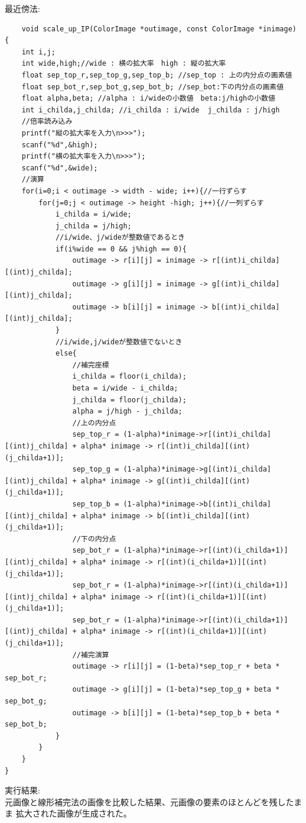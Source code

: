 \documentclass[a4paper,titlepage,11pt]{ltjsarticle}
\begin{document}
最近傍法:
\begin{lstlisting}
	void scale_up_IP(ColorImage *outimage, const ColorImage *inimage)
{
	int i,j;
	int wide,high;//wide : 横の拡大率　high : 縦の拡大率
	float sep_top_r,sep_top_g,sep_top_b; //sep_top : 上の内分点の画素値
	float sep_bot_r,sep_bot_g,sep_bot_b; //sep_bot:下の内分点の画素値
	float alpha,beta; //alpha : i/wideの小数値　beta:j/highの小数値
	int i_childa,j_childa; //i_childa : i/wide  j_childa : j/high
	//倍率読み込み
	printf("縦の拡大率を入力\n>>>");
	scanf("%d",&high);
	printf("横の拡大率を入力\n>>>");
	scanf("%d",&wide);
	//演算
	for(i=0;i < outimage -> width - wide; i++){//一行ずらす
		for(j=0;j < outimage -> height -high; j++){//一列ずらす
			i_childa = i/wide;
			j_childa = j/high;
			//i/wide、j/wideが整数値であるとき
			if(i%wide == 0 && j%high == 0){
				outimage -> r[i][j] = inimage -> r[(int)i_childa][(int)j_childa];
				outimage -> g[i][j] = inimage -> g[(int)i_childa][(int)j_childa];
				outimage -> b[i][j] = inimage -> b[(int)i_childa][(int)j_childa];
			}
			//i/wide,j/wideが整数値でないとき
			else{
				//補完座標
				i_childa = floor(i_childa);
				beta = i/wide - i_childa;
				j_childa = floor(j_childa);
				alpha = j/high - j_childa;
				//上の内分点
				sep_top_r = (1-alpha)*inimage->r[(int)i_childa][(int)j_childa] + alpha* inimage -> r[(int)i_childa][(int)(j_childa+1)];
				sep_top_g = (1-alpha)*inimage->g[(int)i_childa][(int)j_childa] + alpha* inimage -> g[(int)i_childa][(int)(j_childa+1)];
				sep_top_b = (1-alpha)*inimage->b[(int)i_childa][(int)j_childa] + alpha* inimage -> b[(int)i_childa][(int)(j_childa+1)];
				//下の内分点
				sep_bot_r = (1-alpha)*inimage->r[(int)(i_childa+1)][(int)j_childa] + alpha* inimage -> r[(int)(i_childa+1)][(int)(j_childa+1)];
				sep_bot_r = (1-alpha)*inimage->r[(int)(i_childa+1)][(int)j_childa] + alpha* inimage -> r[(int)(i_childa+1)][(int)(j_childa+1)];
				sep_bot_r = (1-alpha)*inimage->r[(int)(i_childa+1)][(int)j_childa] + alpha* inimage -> r[(int)(i_childa+1)][(int)(j_childa+1)];
				//補完演算
				outimage -> r[i][j] = (1-beta)*sep_top_r + beta * sep_bot_r;
				outimage -> g[i][j] = (1-beta)*sep_top_g + beta * sep_bot_g;
				outimage -> b[i][j] = (1-beta)*sep_top_b + beta * sep_bot_b;
			}
		}
	}
}
\end{lstlisting}
\newpage
実行結果:\\		
元画像と線形補完法の画像を比較した結果、元画像の要素のほとんどを残したまま
拡大された画像が生成された。
\end{document}
